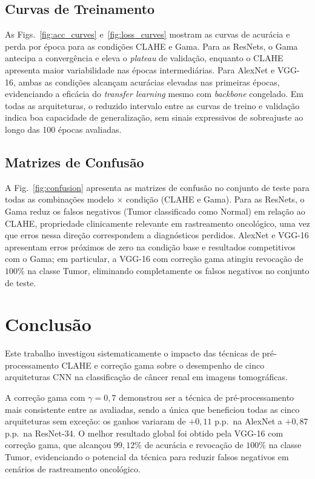 \documentclass[conference]{IEEEtran}
\begin{document}
\subsection{Curvas de Treinamento}

As Figs.~\ref{fig:acc_curves} e~\ref{fig:loss_curves} mostram as curvas de
acurácia e perda por época para as condições CLAHE e Gama. Para as ResNets,
o Gama antecipa a convergência e eleva o \textit{plateau} de validação,
enquanto o CLAHE apresenta maior variabilidade nas épocas intermediárias.
Para AlexNet e VGG-16, ambas as condições alcançam acurácias elevadas nas
primeiras épocas, evidenciando a eficácia do \textit{transfer learning} mesmo
com \textit{backbone} congelado. Em todas as arquiteturas, o reduzido intervalo
entre as curvas de treino e validação indica boa capacidade de generalização,
sem sinais expressivos de sobreajuste ao longo das 100 épocas avaliadas.

\subsection{Matrizes de Confusão}

A Fig.~\ref{fig:confusion} apresenta as matrizes de confusão no conjunto de
teste para todas as combinações modelo $\times$ condição (CLAHE e Gama).
Para as ResNets, o Gama reduz os falsos negativos (Tumor classificado como
Normal) em relação ao CLAHE, propriedade clinicamente relevante em
rastreamento oncológico, uma vez que erros nessa direção correspondem a
diagnósticos perdidos. AlexNet e VGG-16 apresentam erros próximos de zero
na condição base e resultados competitivos com o Gama; em particular, a
VGG-16 com correção gama atingiu revocação de $100\%$ na classe Tumor,
eliminando completamente os falsos negativos no conjunto de teste.

\FloatBarrier
\section{Conclusão}

Este trabalho investigou sistematicamente o impacto das técnicas de
pré-processamento CLAHE e correção gama sobre o desempenho de cinco
arquiteturas CNN na classificação de câncer renal em imagens tomográficas.

A correção gama com $\gamma{=}0{,}7$ demonstrou ser a
técnica de pré-processamento mais consistente entre as avaliadas, sendo a
única que beneficiou todas as cinco arquiteturas sem exceção: os ganhos
variaram de $+0{,}11$ p.p.\ na AlexNet a $+0{,}87$ p.p.\ na ResNet-34.
O melhor resultado global foi obtido
pela VGG-16 com correção gama, que alcançou $99{,}12\%$ de acurácia e
revocação de $100\%$ na classe Tumor, evidenciando o potencial da técnica para
reduzir falsos negativos em cenários de rastreamento oncológico.
\end{document}
